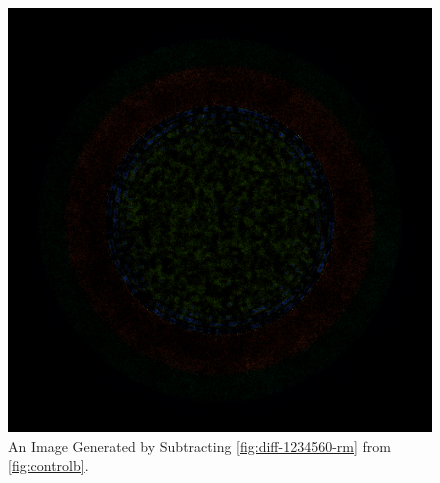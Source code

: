\begin{figure}[H]
\centering
\includegraphics[width=0.6\linewidth]{figures/shuffle/diff-1234560}
\caption{An Image Generated by Subtracting \ref{fig:diff-1234560-rm} from \ref{fig:controlb}.}
\label{fig:diff-1234560}
\end{figure}